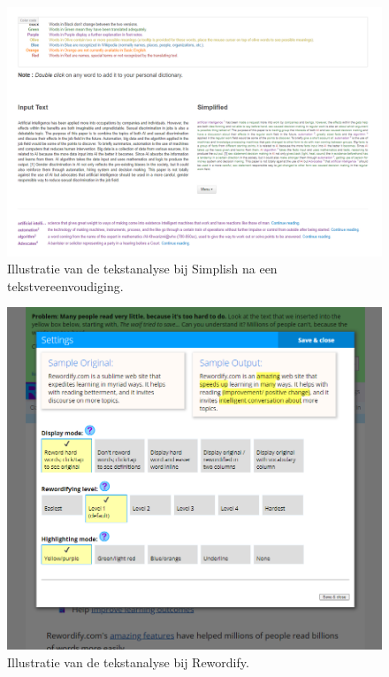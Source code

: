 \begin{figure}[H]
	\includegraphics[width=\linewidth]{img/simplish-output.png}
	\caption{Illustratie van de tekstanalyse bij Simplish na een tekstvereenvoudiging.}
	\label{img:simplish-output}
\end{figure}

\begin{figure}[H]
	\includegraphics[width=\linewidth]{img/scholarcy-attempt.png}
	\caption{Illustratie van de tekstanalyse bij Rewordify.}
	\label{img:scholarcy}
\end{figure}